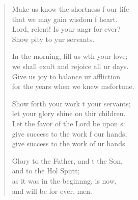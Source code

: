 \begin{verse}
\begin{patverse}
Make us know the shortness f our life\Med\\
that we may gain wisdom f heart.\\
Lord, relent! Is your angr for ever?\Med\\
Show pity to yur servants.

In the morning, fill us w\pointup{\i}th your love;\Med\\
we shall exult and rejoice all ur days.\\
Give us joy to balance ur affliction\Med\\
for the years when we knew m\pointup{\i}sfortune.

Show forth your work t your servants;\Med\\
let your glory shine on thir children.\\
Let the favor of the Lord be upon s:\Flex\\
give success to the work f our hands,\Med\\
give success to the work of ur hands.

Glory to the Father, and t the Son,\Med\\
and to the Hol Spirit;\\
as it was in the beginn\pointup{\i}ng, is now,\Med\\
and will be for ever, men.
  \end{patverse}
\end{verse}

